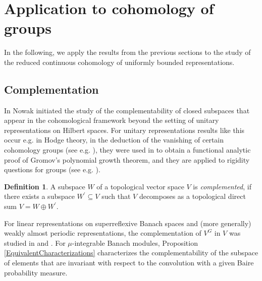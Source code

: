 \documentclass[a4paper,11pt,reqno]{amsart}
\numberwithin{equation}{section}
\theoremstyle{definition}
\newtheorem{definition}[theorem]{Definition}
\theoremstyle{remark}
\theoremstyle{remark}
\begin{document}
\vspace{3mm}



\section{Application to cohomology of groups\label{sec:Application-to-cohomology}}

In the following, we apply the results from the previous sections to the study of the reduced continuous cohomology of uniformly bounded representations.

\vspace{3mm}


\subsection{Complementation\label{subsec:Complementability}}

In \cite{Nowak17} Nowak initiated the study of the complementability of closed subspaces that appear in the cohomological framework beyond the setting of unitary representations on Hilbert spaces. For unitary representations results like this occur e.g. in Hodge theory, in the deduction of the vanishing of certain cohomology groups (see e.g. \cite{Garland73}), they were used in \cite{Ozawa18} to obtain a functional analytic proof of Gromov's polynomial growth theorem, and they are applied to rigidity questions for groups (see e.g. \cite{Shalom00}).

\begin{definition} A subspace $W$ of a topological vector space $V$ is \emph{complemented}, if there exists a subspace $W^{\prime}\subseteq V$ such that $V$ decomposes as a topological direct sum $V=W\oplus W^{\prime}$. \end{definition}

For linear representations on superreflexive Banach spaces and (more generally) weakly almost periodic representations, the complementation of $V^{G}$ in $V$ was studied in \cite{BaderFurmanGelanderMonod} and \cite{BaderRosendalSauer}. For $\mu$-integrable Banach modules, Proposition \ref{EquivalentCharacterizations} characterizes the complementability of the subspace of elements that are invariant with respect to the convolution with a given Baire probability measure.
\end{document}
